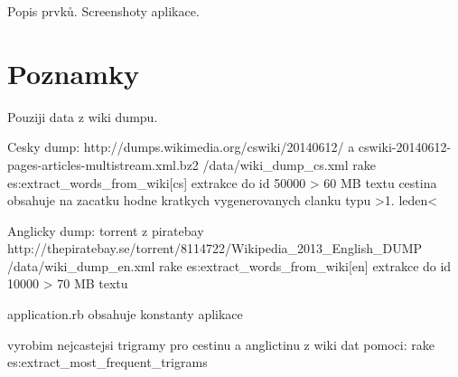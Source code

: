 Popis prvků. Screenshoty aplikace.

\section{Poznamky}

Pouziji data z wiki dumpu.

Cesky dump:
http://dumps.wikimedia.org/cswiki/20140612/ a cswiki-20140612-pages-articles-multistream.xml.bz2
/data/wiki_dump_cs.xml
rake es:extract_words_from_wiki[cs]
extrakce do id 50000 > 60 MB textu
cestina obsahuje na zacatku hodne kratkych vygenerovanych clanku typu >1. leden<

Anglicky dump:
torrent z piratebay http://thepiratebay.se/torrent/8114722/Wikipedia_2013_English_DUMP
/data/wiki_dump_en.xml
rake es:extract_words_from_wiki[en]
extrakce do id 10000 > 70 MB textu

application.rb obsahuje konstanty aplikace

vyrobim nejcastejsi trigramy pro cestinu a anglictinu z wiki dat pomoci:
rake es:extract_most_frequent_trigrams




